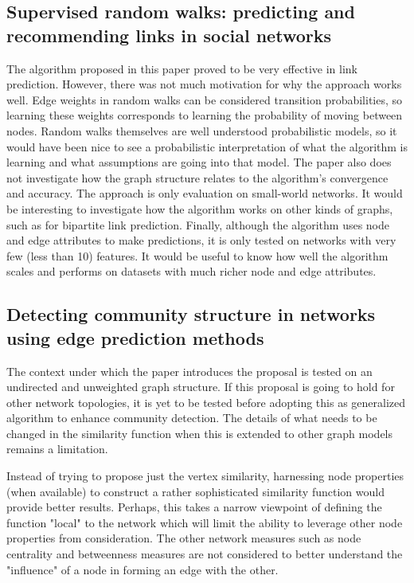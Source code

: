 \documentclass[11pt]{article}
\begin{document}
\subsection{Supervised random walks: predicting and recommending links in social networks \cite{backstromjure}}
The algorithm proposed in this paper proved to be very effective in link prediction. However, there was not much motivation for why the approach works well. Edge weights in random walks can be considered transition probabilities, so learning these weights corresponds to learning the probability of moving between nodes. Random walks themselves are well understood probabilistic models, so it would have been nice to see a probabilistic interpretation of what the algorithm is learning and what assumptions are going into that model. The paper also does not investigate how the graph structure relates to the algorithm's convergence and accuracy. The approach is only evaluation on small-world networks. It would be interesting to investigate how the algorithm works on other kinds of graphs, such as for bipartite link prediction. Finally, although the algorithm uses node and edge attributes to make predictions, it is only tested on networks with very few (less than 10)  features. It would be useful to know how well the algorithm scales and performs on datasets with much richer node and edge attributes. 

\subsection{Detecting community structure in networks using edge prediction methods \cite{yangregory}}
The context under which the paper introduces the proposal is tested on an undirected and unweighted graph structure. If this proposal is going to hold for other network topologies, it is yet to be tested before adopting this as generalized algorithm to enhance community detection. The details of what needs to be changed in the similarity function when this is extended to other graph models remains a limitation.\\
\par
Instead of trying to propose just the vertex similarity, harnessing node properties (when available) to construct a rather sophisticated similarity function would provide better results. Perhaps, this takes a narrow viewpoint of defining the function "local" to the network which will limit the ability to leverage other node properties from consideration. The other network measures such as node centrality and betweenness measures are not considered to better understand the "influence" of a node in forming an edge with the other.
\end{document}
